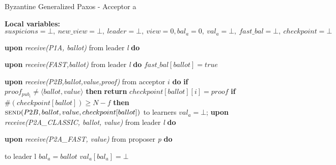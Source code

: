\begin{algorithm} 
	\caption{Byzantine Generalized Paxos - Acceptor a}
	\label{BFT-Acc}
	\textbf{Local variables:} $suspicions = \bot,\ new\_view = \bot,\ leader = \bot,\ view = 0, bal_a = 0,\ val_a = \bot,\ fast\_bal = \bot,\ checkpoint=\bot$
	\begin{algorithmic}[1]
		\State \textbf{upon} \textit{receive(P1A, ballot)} from leader \textit{l} \textbf{do}
		\State \hspace{\algorithmicindent} 
		
		\State
		\State \textbf{upon} \textit{receive(FAST,ballot)} from leader \textit{l} \textbf{do}
		\State \hspace{\algorithmicindent} $fast\_bal[ballot] = true$
		
		\State
		\State \textbf{upon} \textit{receive(P2B,ballot,value,proof)} from acceptor $i$ \textbf{do}
		\State \hspace{\algorithmicindent} \textbf{if} $proof_{pub_i} \neq \langle ballot, value \rangle$ \textbf{then}
		\State \hspace{\algorithmicindent}\hspace{\algorithmicindent} \textbf{return}
		\State \hspace{\algorithmicindent} $checkpoint[ballot][i] = proof$
		\State \hspace{\algorithmicindent} \textbf{if} $\#(checkpoint[ballot]) \geq N-f$ \textbf{then}
		\State \hspace{\algorithmicindent}\hspace{\algorithmicindent} $\Call{send}{P2B, ballot, value, checkpoint[ballot]}$ to learners
		\State \hspace{\algorithmicindent}\hspace{\algorithmicindent} $val_a = \bot$;
		\State
		\State \textbf{upon} \textit{receive(P2A\_CLASSIC, ballot, value)} from leader \textit{l} \textbf{do}
		\State \hspace{\algorithmicindent} 

		\State		
		\State \textbf{upon} \textit{receive(P2A\_FAST, value)} from proposer \textit{p} \textbf{do}
		\State \hspace{\algorithmicindent} 
				
		\State
		\State {} to leader l
		\State $bal_a = ballot$
		\State $val_a[bal_a] = \bot$
		\EndIf
		\EndFunction
	

\end{algorithmic}
\end{algorithm}
